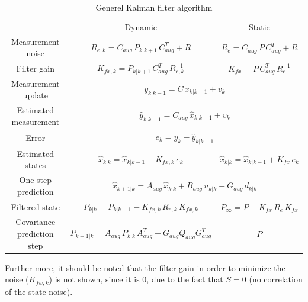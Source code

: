\begin{table}[H]
    \centering
    \begin{tabular}{c|c|c}
         & Dynamic & Static\\
        Measurement noise & $R_{e,k}=C_{aug}\,P_{k|k+1}\,C_{aug}^T+R$ & $R_{e}=C_{aug}\,P\,C_{aug}^T+R$\\
        Filter gain & $K_{fx,k}=P_{k|k+1}\,C_{aug}^T\,R_{e,k}^{-1}$ & $K_{fx}=P\,C_{aug}^T\,R_e^{-1}$\\
        Measurement update & \multicolumn{2}{c}{$y_{k|k-1}=C\,x_{k|k-1}+v_k$} \\
        Estimated measurement & \multicolumn{2}{c}{$\hat{y}_{k|k-1}=C_{aug}\,\hat{x}_{k|k-1}+v_k$}\\
        Error & \multicolumn{2}{c}{$e_k=y_k-\hat{y}_{k|k-1}$} \\
        Estimated states & $\hat{x}_{k|k}=\hat{x}_{k|k-1}+K_{fx,k}\,e_k$ & $\hat{x}_{k|k}=\hat{x}_{k|k-1}+K_{fx}\,e_k$ \\
        One step prediction & \multicolumn{2}{c}{$\hat{x}_{k+1|k}=A_{aug}\,\hat{x}_{k|k}+B_{aug}\,u_{k|k}+G_{aug}\,d_{k|k}$} \\
        Filtered state  & $P_{k|k}=P_{k|k-1}-K_{fx,k}\,R_{e,k}\,K_{fx,k}$ & $P_{\infty}=P-K_{fx}\,R_{e}\,K_{fx}$\\
        Covariance prediction step & $P_{k+1|k}=A_{aug}\,P_{k|k}\,A_{aug}^T+G_{aug}Q_{aug}G_{aug}^T$ & $P$
    \end{tabular}
    \caption{Generel Kalman filter algorithm}
    \label{tab:Kalman_gen}
\end{table}
Further more, it should be noted that the filter gain in order to minimize the noise ($K_{fw,k}$) is not shown, since it is 0, due to the fact that $S=0$ (no correlation of the state noise).
